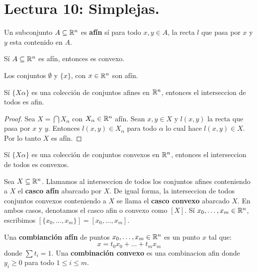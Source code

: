 \section*{Lectura 10: Simplejas.}

\begin{definition}
    Un subconjunto $A \subseteq \mathbb{R}^n$ es  \textbf{af\'in} s\'i para todo $x,y
    \in A$, la recta  $l$ que pasa por  $x$ y  $y$ esta contenido en  $A$.
\end{definition}

\begin{lemma}\label{10.23}
    S\'i $A \subseteq \mathbb{R}^n$ es af\'in, entonces es convexo.
\end{lemma}

\begin{example}\label{}
    Los conjuntos $\emptyset$ y $\{x\}$, con $x \in \mathbb{R}^n$ son af\'in.
\end{example}

\begin{theorem}\label{10.24}
    S\'i $\{X\alpha\}$ es una colecci\'on de conjuntos afines en $\mathbb{R}^n$,
    entonces el interseccion de todos es afin.
\end{theorem}
\begin{proof}
    Sea $X=\bigcap{X_\alpha}$ con $X_\alpha \in \mathbb{R}^n$ af\'in. Sean  $x,y \in X$
    y  $l(x,y)$ la recta que pasa por $x$ y  $y$. Entonces  $l(x,y) \in
    X_\alpha$ para todo $\alpha$ lo cual hace  $l(x,y) \in X$. Por lo tanto $X$
    es af\'in.
\end{proof}
\begin{corollary}
    S\'i $\{X\alpha\}$ es una colecci\'on de conjuntos convexos en $\mathbb{R}^n$,
    entonces el interseccion de todos es convexos.
\end{corollary}

\begin{definition}
    Sea $X \subseteq \mathbb{R}^n$. Llamamos al interseccion de todos los conjuntos
    afines conteniendo a $X$ el  \textbf{casco af\'in} abarcado por $X$. De
    igual forma, la interseccion de todos conjuntos convexos conteniendo a  $X$
    se llama el \textbf{casco convexo} abarcado $X$. En ambos casos, denotamos
    el casco afin o convexo como $[X]$. S\'i $x_0, \dots, x_m \in \mathbb{R}^n$,
    escribimos $[\{x_0, \dots, x_m\}]=[x_0, \dots, x_m]$.
\end{definition}

\begin{definition}
    Una \textbf{combianci\'on af\'in} de puntos $x_0, \dots, x_m \in \mathbb{R}^n$ es un
    punto $x$ tal que:
    \begin{equation*}
        x=t_0x_0+\dots+t_mx_m
    \end{equation*}
    donde $\sum{t_i}=1$. Una \textbf{combinaci\'on convexo} es una combinacion
    afin donde $y_i \geq 0$ para todo  $1 \leq i \leq m$.
\end{definition}

